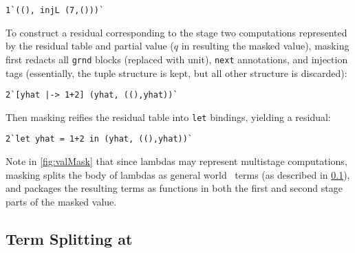\begin{abstrsyn}
\begin{lstlisting}
1`((), injL (7,()))`
\end{lstlisting}
To construct a residual corresponding to the stage two computations
represented by the residual table and partial value ($q$ in resulting
the masked value), masking first redacts all \texttt{grnd} blocks
(replaced with unit), \texttt{next} annotations, and injection tags
(essentially, the tuple structure is kept, but all other structure is
discarded):
\begin{lstlisting}
2`[yhat |-> 1+2] (yhat, ((),yhat))`
\end{lstlisting}
Then masking reifies the residual table into \texttt{let} bindings,
yielding a residual:
\begin{lstlisting}
2`let yhat = 1+2 in (yhat, ((),yhat))`
\end{lstlisting}

Note in \ref{fig:valMask} that since lambdas may represent multistage
computations, masking splits the body of lambdas as general world
\bbonem\ terms (as described in \ref{sec:split-one}), and packages the
resulting terms as functions in both the first and second stage parts
of the masked value.



\subsection{Term Splitting at \bbonem}
\label{sec:split-one}


\end{abstrsyn}

